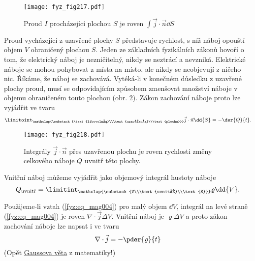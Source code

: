       \begin{figure}[ht!]
        \centering
        \texttt{[image: fyz\_fig217.pdf]}
        \caption{Proud \(I\) procházející plochou \(S\) je roven \(\int\vec{j}\cdot\vec{n}\dd{S}\)}
        \label{fyz:fig217} 
      \end{figure}
      Proud vycházející z uzavřené plochy \(S\) představuje rychlost, s níž náboj opouští objem 
      \(V\) ohraničený plochou \(S\). Jeden ze základních fyzikálních zákonů hovoří o tom, že 
      elektrický náboj je nezničitelný, nikdy se neztrácí a nevzniká. Elektrické náboje se mohou 
      pohybovat z místa na místo, ale nikdy se neobjevují z ničeho nic. Říkáme, že náboj se 
      zachovává. Vytéká-li v konečném důsledku z uzavřené plochy proud, musí se odpovídajícím 
      způsobem zmenšovat množství náboje v objemu ohraničeném touto plochou (obr. 
      \ref{fyz:fig218}). Zákon zachování náboje proto lze vyjádřit ve tvaru
      \begin{equation}\label{fyz:eq_mag004} 
        \limitoint_{\mathclap{\substack{\text{libovolná}\\\text{uzavřená}\\\text{plocha}}}}
        \vec{j}\cdot\vec{n}\dd{S} = -\der{Q}{t}.
      \end{equation} 
      \begin{figure}[ht!]
        \centering
        \texttt{[image: fyz\_fig218.pdf]}
        \caption{Integrály \(\vec{j}\cdot\vec{n}\) přes uzavřenou plochu je roven rychlosti změny 
                 celkového náboje \(Q\) uvnitř této plochy.}
        \label{fyz:fig218} 
      \end{figure}
      Vnitřní náboj můžeme vyjádřit jako objemový integrál hustoty náboje
      \begin{equation}\label{fyz:eq_mag005} 
        Q_{\text{uvnitř}} = 
         \limitint_{\mathclap{\substack{V\\\text{uvnitř}\\\text{S}}}}\varrho\dd{V}.
      \end{equation}
      
      Použijeme-li vztah (\ref{fyz:eq_mag004}) pro malý objem \(\dd{V}\), integrál na levé straně 
      (\ref{fyz:eq_mag004}) je roven \(\nabla\cdot\vec{j}\Delta V\). Vnitřní náboj je 
      \(\varrho\Delta V\) a proto zákon zachování náboje lze napsat i ve tvaru
      \begin{equation}\label{fyz:eq_mag006}    %
        \nabla\cdot\vec{j} = -\pder{\varrho}{t}
      \end{equation}
      (Opět \hyperlink{fyz:IIchapIIIsecIII}{Gaussova věta} z matematiky!)

